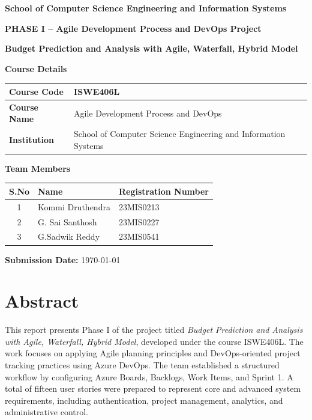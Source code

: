 \documentclass[12pt,a4paper]{article}
\begin{document}
\begin{titlepage}
\centering

{\Large \textbf{School of Computer Science Engineering and Information Systems} \par}
\vspace{1.5cm}

{\Large \textbf{PHASE I -- Agile Development Process and DevOps Project} \par}
\vspace{0.8cm}

{\huge \textbf{Budget Prediction and Analysis with Agile, Waterfall, Hybrid Model} \par}
\vspace{1.5cm}

{\large \textbf{Course Details} \par}
\vspace{0.4cm}

\begin{tabular}{|p{4.2cm}|p{9.5cm}|}
\hline
\textbf{Course Code} & ISWE406L \\
\hline
\textbf{Course Name} & Agile Development Process and DevOps \\
\hline
\textbf{Institution} & School of Computer Science Engineering and Information Systems \\
\hline
\end{tabular}

\vspace{1.2cm}
{\large \textbf{Team Members} \par}
\vspace{0.4cm}

\begin{tabular}{|c|p{6cm}|p{5cm}|}
\hline
\textbf{S.No} & \textbf{Name} & \textbf{Registration Number} \\
\hline
1 & Kommi Druthendra & 23MIS0213 \\
\hline
2 & G. Sai Santhosh & 23MIS0227 \\
\hline
3 & G.Sadwik Reddy & 23MIS0541 \\
\hline
\end{tabular}

\vfill

\textbf{Submission Date:} \today

\end{titlepage}

\tableofcontents
\newpage

\section{Abstract}
This report presents Phase I of the project titled \textit{Budget Prediction and Analysis with Agile, Waterfall, Hybrid Model}, developed under the course ISWE406L. The work focuses on applying Agile planning principles and DevOps-oriented project tracking practices using Azure DevOps. The team established a structured workflow by configuring Azure Boards, Backlogs, Work Items, and Sprint 1. A total of fifteen user stories were prepared to represent core and advanced system requirements, including authentication, project management, analytics, and administrative control.
\end{document}
